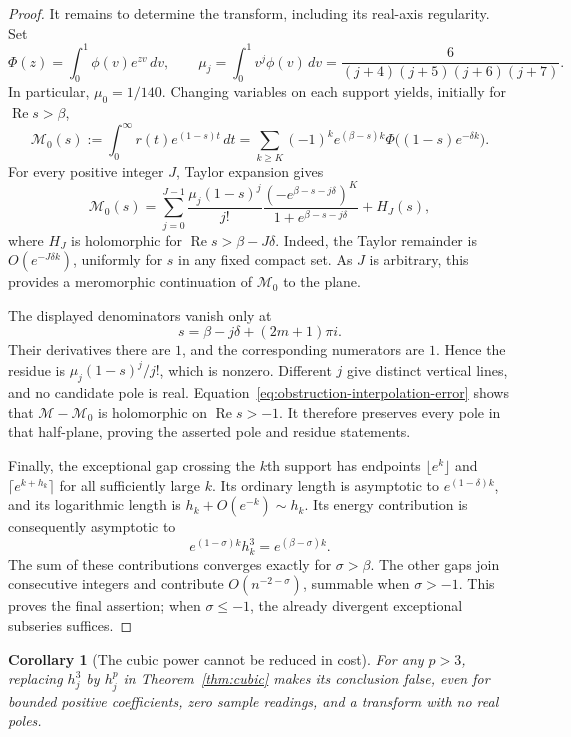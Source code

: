 \documentclass[11pt,a4paper]{article}
\newtheorem{corollary}[theorem]{Corollary}
\theoremstyle{definition}
\theoremstyle{remark}
\numberwithin{equation}{section}
\begin{document}
\begin{proof}
It remains to determine the transform, including its real-axis
regularity. Set
\[
 \Phi(z)=\int_0^1\phi(v)e^{zv}\,dv,\qquad
 \mu_j=\int_0^1v^j\phi(v)\,dv
       =\frac6{(j+4)(j+5)(j+6)(j+7)}.
\]
In particular, $\mu_0=1/140$. Changing variables on each support yields,
initially for $\operatorname{Re}s>\beta$,
\[
 \mathcal M_0(s):=\int_0^\infty r(t)e^{(1-s)t}\,dt
 =\sum_{k\geq K}(-1)^k e^{(\beta-s)k}
       \Phi\bigl((1-s)e^{-\delta k}\bigr).
\]
For every positive integer $J$, Taylor expansion gives
\begin{equation}
 \mathcal M_0(s)=
 \sum_{j=0}^{J-1}\frac{\mu_j(1-s)^j}{j!}
       \frac{(-e^{\beta-s-j\delta})^K}
            {1+e^{\beta-s-j\delta}}
       +H_J(s),
 \label{eq:obstruction-continuation}
\end{equation}
where $H_J$ is holomorphic for
$\operatorname{Re}s>\beta-J\delta$. Indeed, the Taylor remainder is
$O(e^{-J\delta k})$, uniformly for $s$ in any fixed compact set.
As $J$ is arbitrary, this provides a meromorphic continuation of
$\mathcal M_0$ to the plane.

The displayed denominators vanish only at
\[
 s=\beta-j\delta+(2m+1)\pi i.
\]
Their derivatives there are $1$, and the corresponding numerators are
$1$. Hence the residue is $\mu_j(1-s)^j/j!$, which is nonzero. Different
$j$ give distinct vertical lines, and no candidate pole is real.
Equation~\eqref{eq:obstruction-interpolation-error} shows that
$\mathcal M-\mathcal M_0$ is holomorphic on
$\operatorname{Re}s>-1$. It therefore preserves every pole in that
half-plane, proving the asserted pole and residue statements.

Finally, the exceptional gap crossing the $k$th support has endpoints
$\lfloor e^k\rfloor$ and $\lceil e^{k+h_k}\rceil$ for all sufficiently
large $k$. Its ordinary length is asymptotic to $e^{(1-\delta)k}$,
and its logarithmic length is $h_k+O(e^{-k})\sim h_k$. Its energy
contribution is consequently asymptotic to
\[
 e^{(1-\sigma)k}h_k^3=e^{(\beta-\sigma)k}.
\]
The sum of these contributions converges exactly for $\sigma>\beta$.
The other gaps join consecutive integers and contribute
$O(n^{-2-\sigma})$, summable when $\sigma>-1$. This proves the final
assertion; when $\sigma\leq-1$, the already divergent exceptional
subseries suffices.
\end{proof}

\begin{corollary}[The cubic power cannot be reduced in cost]
\label{cor:cubic-optimal}
For any \(p>3\), replacing \(h_j^3\) by \(h_j^p\) in
Theorem~\ref{thm:cubic} makes its conclusion false, even for
bounded positive coefficients, zero sample readings, and a transform
with no real poles.
\end{corollary}
\end{document}
